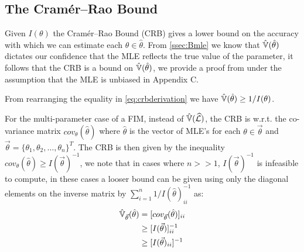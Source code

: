 \subsection{The Cramér–Rao Bound}
\label{ssec:Bcrb}

Given $I(\theta)$ the Cramér–Rao Bound (CRB) gives a lower bound on the accuracy with which we can estimate each $\theta\in\hat\theta$. From \cref{ssec:Bmle} we know that $\operatorname{\hat{\mathbb{V}}}(\hat\theta)$ dictates our confidence that the MLE reflects the true value of the parameter, it follows that the CRB is a bound on $\operatorname{\hat{\mathbb{V}}}(\hat\theta)$, we provide a proof from \cite{trees_detection_2013} under the assumption that the MLE is unbiased in Appendix C.

From rearranging the equality in \cref{eq:crbderivation} we have $\operatorname{\hat{\mathbb{V}}}(\hat\theta) \geq 1/I(\theta)$.\par
For the multi-parameter case of a FIM, instead of $\operatorname{\hat{\mathbb{V}}}(\widehat{\mathcal{L}})$, the CRB is w.r.t. the co-variance matrix $cov_\theta(\hat\theta)$ where $\hat\theta$ is the vector of MLE's for each  $\theta\in\vec{\theta}$ and $\vec{\theta}=\{\theta_1,\theta_2,\ldots,\theta_n\}^T$. The CRB is then given by the inequality $cov_\theta(\hat\theta)\geq I(\vec{\theta})^{-1}$, we note that in cases where $n>>1$, $I(\vec{\theta})^{-1}$ is infeasible to compute, in these cases a looser bound can be given using only the diagonal elements on the inverse matrix by $\sum_{i=1}^n 1/I(\hat\theta)_{ii}^{-1}$ as:
\begin{align*}
    \operatorname{\hat{\mathbb{V}}}_{\vec{\theta}}(\hat\theta) &= [cov_{\vec{\theta}}(\hat\theta)]_{ii}\\
    &\geq [I(\vec{\theta})]^{-1}_{ii}\\
    &\geq [I(\vec{\theta})_{ii}]^{-1}
\end{align*}

